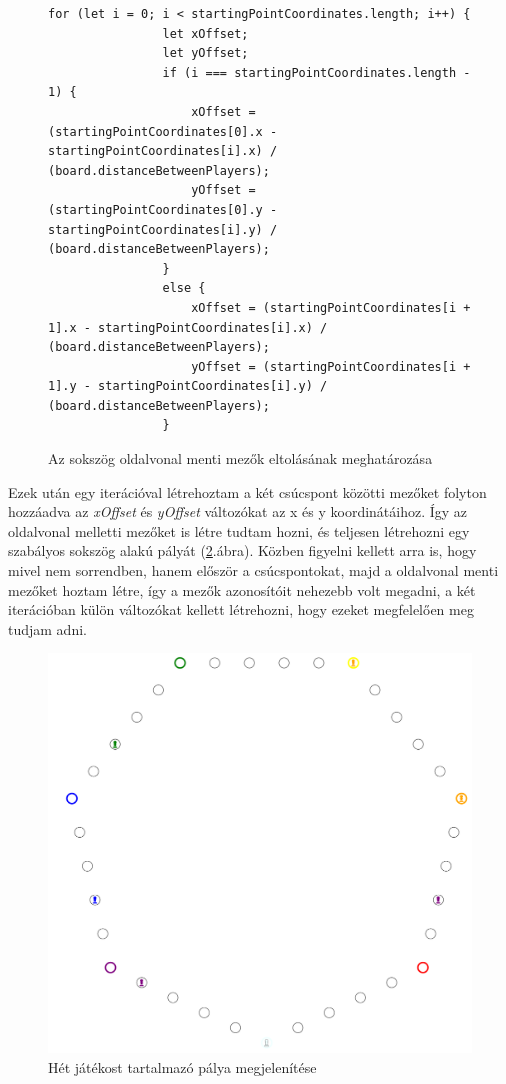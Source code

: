 \documentclass[a4paper,twoside]{article}
\begin{document}
\begin{figure}
	\caption{Az sokszög oldalvonal menti mezők eltolásának meghatározása}
	\begin{minipage}{\textwidth}
		\begin{lstlisting}[style=javascriptStyle]
			    for (let i = 0; i < startingPointCoordinates.length; i++) {
				let xOffset;
				let yOffset;
				if (i === startingPointCoordinates.length - 1) {
					xOffset = (startingPointCoordinates[0].x - startingPointCoordinates[i].x) / (board.distanceBetweenPlayers);
					yOffset = (startingPointCoordinates[0].y - startingPointCoordinates[i].y) / (board.distanceBetweenPlayers);
				}
				else {
					xOffset = (startingPointCoordinates[i + 1].x - startingPointCoordinates[i].x) / (board.distanceBetweenPlayers);
					yOffset = (startingPointCoordinates[i + 1].y - startingPointCoordinates[i].y) / (board.distanceBetweenPlayers);
				}
		\end{lstlisting}
	\end{minipage}
	
	\label{xOffsetMeghat}
\end{figure}
\FloatBarrier

Ezek után egy iterációval létrehoztam a két csúcspont közötti mezőket folyton hozzáadva az \textit{xOffset} és \textit{yOffset} változókat az x és y koordinátáihoz. Így az oldalvonal melletti mezőket is létre tudtam hozni, és teljesen létrehozni egy szabályos sokszög alakú pályát (\ref{hetesPalya}.ábra). Közben figyelni kellett arra is, hogy mivel nem sorrendben, hanem először a csúcspontokat, majd a oldalvonal menti mezőket hoztam létre, így a mezők azonosítóit nehezebb volt megadni, a két iterációban külön változókat kellett létrehozni, hogy ezeket megfelelően meg tudjam adni. 

\begin{figure}
	\caption{Hét játékost tartalmazó pálya megjelenítése}
	\label{hetesPalya}
	\centering
	\includegraphics[scale=0.5]{7espalya}
\end{figure}
\end{document}
